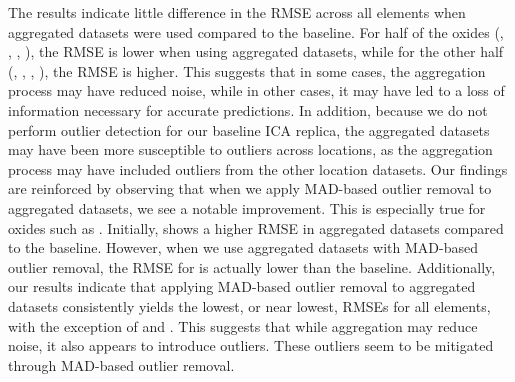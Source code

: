 The results indicate little difference in the RMSE across all elements when aggregated datasets were used compared to the baseline.
For half of the oxides (, , , ), the RMSE is lower when using aggregated datasets, while for the other half (, , , ), the RMSE is higher.
This suggests that in some cases, the aggregation process may have reduced noise, while in other cases, it may have led to a loss of information necessary for accurate predictions.
In addition, because we do not perform outlier detection for our baseline ICA replica, the aggregated datasets may have been more susceptible to outliers across locations, as the aggregation process may have included outliers from the other location datasets.
Our findings are reinforced by observing that when we apply MAD-based outlier removal to aggregated datasets, we see a notable improvement.
This is especially true for oxides such as .
Initially,  shows a higher RMSE in aggregated datasets compared to the baseline.
However, when we use aggregated datasets with MAD-based outlier removal, the RMSE for  is actually lower than the baseline.
Additionally, our results indicate that applying MAD-based outlier removal to aggregated datasets consistently yields the lowest, or near lowest, RMSEs for all elements, with the exception of  and .
This suggests that while aggregation may reduce noise, it also appears to introduce outliers.
These outliers seem to be mitigated through MAD-based outlier removal.